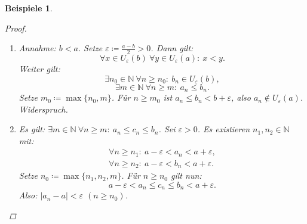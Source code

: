 \documentclass[12pt]{extreport} %
\newcommand{\N}{\mathbb{N}}
\theoremstyle{named}
\theoremstyle{itshape}
\theoremstyle{normal}
\newtheorem*{beispiele}{Beispiele}
\begin{document}
\begin{beispiele}
\begin{proof}
\begin{enumerate}
\begin{enumerate}
\begin{align*}
							  & \leq |a_{n}||b_{n} - b| + |b||a_{n}-a|.
					\end{align*}
					Mit \ref{2.1.b:satz} folgt: $\exists c \geq 0 ~ \forall n \in \N: ~ |a_{n}| \leq c$. Damit erhalten wir:
					$$
					\forall n \in \N: ~ c_{n} \leq c|b_{n}-b| + |b||a_{n}-a| \eqqcolon \alpha_{n}.
					$$	
					Mit c) (ii), c) (iii) und a) folgt: $\alpha_{n} \rightarrow 0$. \\
					Also: $|c_{n} - 0| = c_{n} \leq \alpha_{n}$ $(n \in \N)$ und $\alpha_{n} \rightarrow 0$. Mit b) folgt nun $c_{n} \rightarrow 0$.
				\item   Setze $\varepsilon \coloneqq \frac{|a|}{2}$. Aus (i) folgt: $|a_{n}| \rightarrow |a|$. Damit gilt: 
					$$  
					\exists m \in \N ~ \forall n \geq m: ~ |a_{n}| \in U_{\varepsilon}(|a|) = (|a| - \varepsilon, |a| + \varepsilon) 
					= (\frac{|a|}{2}, \frac{3}{2} |a|). 
					$$
					Insbesondere ist $|a_{n}| > \frac{|a|}{2} > 0$ $(n \geq m)$, also $a_{n} \neq 0$ $(n \geq m)$. Für $n \geq m$ gilt nun:
					$$ \left| \frac{1}{a_{n}} - \frac{1}{a} \right| = \frac{|a_{n} - a|}{|a_{n}||a|} \leq \frac{2|a_{n} - a|}{|a|^{2}} \eqqcolon \alpha_{n}. $$
					Es gilt $\alpha_{n} \rightarrow 0$. Mit b) folgt $\frac{1}{a_{n}} \rightarrow \frac{1}{a}$.
			  \end{enumerate}
			\item Annahme: $b < a$. Setze $\varepsilon \coloneqq \frac{a-b}{2} > 0$.  
					Dann gilt: $$\forall x \in U_{\varepsilon}(b) ~\forall y \in U_{\varepsilon}(a): ~x < y.$$ Weiter gilt: 
					$$ \exists n_{0} \in \N~ \forall n \geq n_{0}: ~ b_{n} \in U_{\varepsilon}(b), $$
					$$ \exists m \in \N ~\forall n \geq m: ~ a_{n} \leq b_{n}. $$
				Setze $m_{0} \coloneqq \max \{ n_{0}, m \}$. Für $n \geq m_{0}$ ist $a_{n} \leq b_{n} < b + \varepsilon$, also $a_{n} \notin U_{\varepsilon}(a)$.
				Widerspruch.
			\item   Es gilt: $\exists m \in \N ~\forall n \geq m: ~ a_{n} \leq c_{n} \leq b_{n}$. Sei $\varepsilon > 0$. Es existieren $n_{1}, n_{2} \in \N$ mit: 
				\begin{align*}
					\forall n \geq n_{1}: ~ a - \varepsilon < a_{n} < a + \varepsilon,  \\
					\forall n \geq n_{2}: ~ a - \varepsilon < b_{n} < a + \varepsilon.
				\end{align*}
				Setze $n_{0} \coloneqq \max \{ n_{1}, n_{2}, m \}$. Für $n \geq n_{0}$ gilt nun:
				$$
					a - \varepsilon < a_{n} \leq c_{n} \leq b_{n} < a + \varepsilon.
				$$
				Also: $|a_{n} - a| < \varepsilon$ $(n \geq n_{0})$.
		\end{enumerate}	
	\end{proof}	
\end{beispiele}
\end{document}
